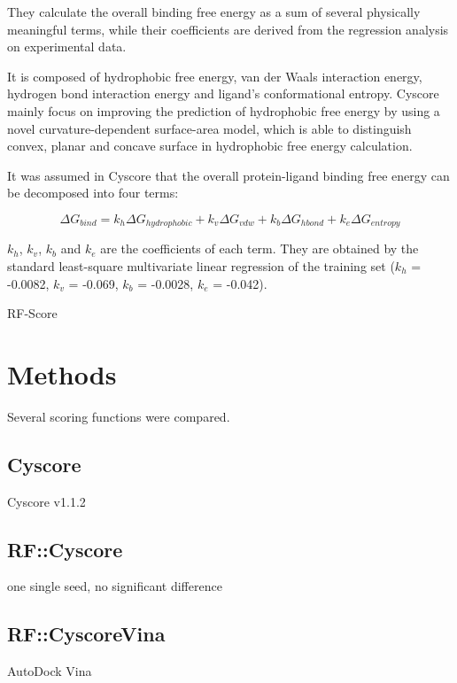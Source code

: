 \documentclass[journal=jacsat,manuscript=article]{achemso}
\begin{document}
 They calculate the overall binding free energy as a sum of several physically meaningful terms, while their coefficients are derived from the regression analysis on experimental data.
 
 It is composed of hydrophobic free energy, van der Waals interaction energy, hydrogen bond interaction energy and ligand's conformational entropy.
 Cyscore mainly focus on improving the prediction of hydrophobic free energy by using a novel curvature-dependent surface-area model, which is able to distinguish convex, planar and concave surface in hydrophobic free energy calculation. 

It was assumed in Cyscore that the overall protein-ligand binding free energy can be decomposed into four terms:

\begin{equation}
  \Delta G_{bind} = k_h\Delta G_{hydrophobic} + k_v\Delta G_{vdw} + k_b\Delta G_{hbond} + k_e\Delta G_{entropy}
  \label{eqn:example}
\end{equation}

$k_h$, $k_v$, $k_b$ and $k_e$ are the coefficients of each term. They are obtained by the standard least-square multivariate linear regression of the training set ($k_h$ = -0.0082, $k_v$ = -0.069, $k_b$ = -0.0028, $k_e$ = -0.042).

RF-Score \cite{564}

\section{Methods}

Several scoring functions were compared.

\subsection{Cyscore}

Cyscore v1.1.2

\subsection{RF::Cyscore}

one single seed, no significant difference

\subsection{RF::CyscoreVina}

AutoDock Vina \cite{595}
\end{document}
